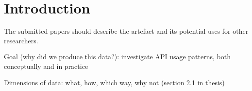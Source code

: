 \section{Introduction}
\label{sec:introduction}



The submitted papers should describe the artefact and its potential uses for other researchers.


Goal (why did we produce this data?):
investigate API usage patterns, both conceptually and in practice

Dimensions of data: what, how, which way, why not (section 2.1 in thesis)


